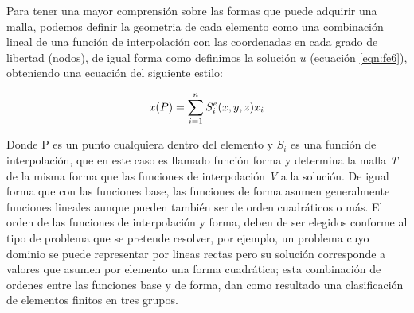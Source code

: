 Para tener una mayor comprensión sobre las formas que puede adquirir una malla, podemos definir la geometria de cada elemento como una combinación lineal de una función de interpolación con las coordenadas en cada grado de libertad (nodos), de igual forma como definimos la solución $u$ (ecuación \ref{eqn:fe6}), obteniendo una ecuación del siguiente estilo:

\begin{equation}
\label{eqn:fe21}
    \\x(P)=\displaystyle\sum_{i=1}^n  S_{i}^{e}(x,y,z)x_{i}        
\end{equation}

Donde P es un punto cualquiera dentro del elemento y $S_{i}$ es una función de interpolación, que en este caso es llamado función forma y determina la malla \textit{T} de la misma forma que las funciones de interpolación \textit{V} a la solución. De igual forma que con las funciones base, las funciones de forma asumen generalmente funciones lineales aunque pueden también ser de orden cuadráticos o más. El orden de las funciones de interpolación y forma, deben de ser elegidos conforme al tipo de problema que se pretende resolver, por ejemplo, un problema cuyo dominio se puede representar por lineas rectas pero su solución corresponde a valores que asumen por elemento una forma cuadrática; esta combinación de ordenes entre las funciones base y de forma, dan como resultado una clasificación de elementos finitos en tres grupos.
\\

